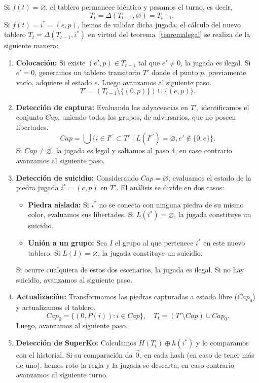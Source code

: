 Si $f(t) = \varnothing$, el tablero permanece idéntico y pasamos el turno, es decir,
$$T_{t} = \Delta(T_{t-1}, \varnothing) = T_{t-1}.$$
Si $f(t) = i^{*} = (e, p)$, hemos de validar dicha jugada, el cálculo del nuevo tablero $T_t = \Delta(T_{t-1}, i^{*})$ en virtud del teorema~\ref{teoremalegal} se realiza de la siguiente manera:
\begin{enumerate}
	\item \textbf{Colocación:} Si existe $(e',p)\in T_{t-1}$ tal que $e' \neq 0$, la jugada es ilegal. Si $e' =0$, generamos un tablero transitorio $T'$ donde el punto $p$, previamente vacío, adquiere el estado $e$. Luego avanzamos al siguiente paso.
	$$ T' = \left(T_{t-1} \setminus \{(0, p)\}\right) \cup \{(e, p)\}.$$
	
	\item \textbf{Detección de captura:} Evaluando las adyacencias en $T'$, identificamos el conjunto $Cap$, uniendo todos los grupos, de adversarios, que no poseen libertades.
	$$ Cap = \bigcup \{ i\in I^{e'} \subset T' \mid L(I^{e'}) = \varnothing, e' \notin \{0, e\}\}.$$
	Si $Cap \neq \varnothing$, la jugada es legal y saltamos al paso $4$, en caso contrario avanzamos al siguiente paso.
	
	\item \textbf{Detección de suicidio:} Considerando $Cap = \varnothing$, evaluamos el estado de la piedra jugada $i^* = (e, p)$ en $T'$. El análisis se divide en dos casos:
	\begin{itemize}
		\item \textbf{Piedra aislada:} Si $i^*$ no se conecta con ninguna piedra de su mismo color, evaluamos sus libertades. Si $L(i^*) = \varnothing$, la jugada constituye un suicidio.
		\item \textbf{Unión a un grupo:} Sea $I$ el grupo al que pertenece $i^*$ en este nuevo tablero. Si $L(I) = \varnothing$, la jugada  constituye un suicidio.
	\end{itemize}
	Si ocurre cualquiera de estos dos escenarios, la jugada es ilegal. Si no hay suicidio, avanzamos al siguiente paso.
	
	\item \textbf{Actualización:} Transformamos las piedras capturadas a estado libre ($Cap_0$) y actualizamos el tablero.
	$$Cap_0 = \{(0, P(i)) : i \in Cap\},\quad T_t = (T' \setminus Cap) \cup Cap_0.$$
	Luego, avanzamos al siguiente paso.
	
	\item \textbf{Detección de SuperKo:}
	Calculamos $H(T_{t}) \oplus h(i^{*})$ y lo comparamos con el historial. Si su comparación da $\vec{0}$, en cada hash (en caso de tener más de uno), hemos roto la regla y la jugada se descarta, en caso contrario avanzamos al siguiente turno.
\end{enumerate}
